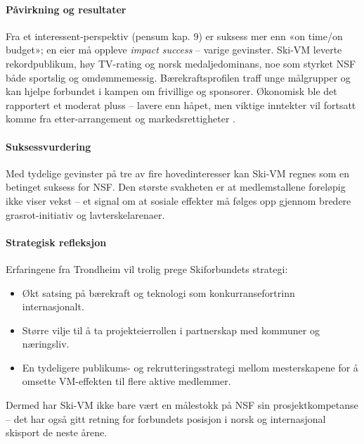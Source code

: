 \paragraph{Påvirkning og resultater}
Fra et interessent-perspektiv (pensum kap. 9) er suksess mer enn «on time/on budget»; en eier må 
oppleve \textit{impact success} -- varige gevinster. Ski-VM leverte rekordpublikum, høy TV-rating 
og norsk medaljedominans, noe som styrket NSF både sportslig og omdømmemessig.
Bærekraftsprofilen traff unge målgrupper og kan hjelpe forbundet i kampen om frivillige 
og sponsorer.
Økonomisk ble det rapportert et moderat pluss -- lavere enn håpet, men viktige inntekter vil 
fortsatt komme fra etter-arrangement og markedsrettigheter \cite{Trondheim2025Portal,Adresseavisen}.

\paragraph{Suksessvurdering}
Med tydelige gevinster på tre av fire hovedinteresser kan Ski-VM regnes som en betinget suksess for NSF. Den største svakheten er at medlemstallene foreløpig ikke viser vekst -- et signal om at sosiale effekter må følges opp gjennom bredere grasrot-initiativ og lavterskelarenaer.

\paragraph{Strategisk refleksjon}
Erfaringene fra Trondheim vil trolig prege Skiforbundets strategi:
\begin{itemize}
    \item Økt satsing på bærekraft og teknologi som konkurransefortrinn internasjonalt.
    \item Større vilje til å ta projekteierrollen i partnerskap med kommuner og næringsliv.
    \item En tydeligere publikums- og rekrutteringsstrategi mellom mesterskapene for å omsette VM-effekten til flere aktive medlemmer.
\end{itemize}

Dermed har Ski-VM ikke bare vært en målestokk på NSF sin prosjektkompetanse -- det har også gitt retning for forbundets posisjon i norsk og internasjonal skisport de neste årene.